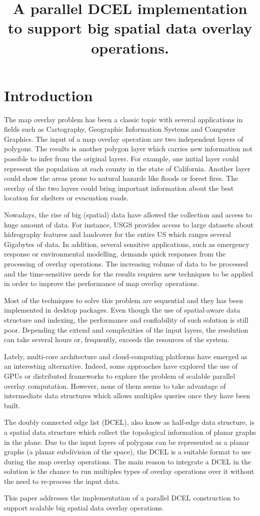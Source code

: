 \documentclass[a4paper,10pt]{article}
\title{A parallel DCEL implementation to support big spatial data overlay
operations.}
\author{}
\begin{document}
\section{Introduction}

The map overlay problem has been a classic topic with several applications in fields such as Cartography, Geographic Information Systems and Computer Graphics.  The input of a map overlay operation are two independent layers of polygons. The results is another polygon layer which carries new information not possible to infer from the original layers. For example, one initial layer could represent the population at each county in the state of California.  Another layer could show the areas prone to natural hazards like floods or forest fires.  The overlay of the two layers could bring important information about the best location for shelters or evacuation roads.

Nowadays, the rise of big (spatial) data have allowed the collection and access to huge amount of data.  For instance, USGS provides access to large datasets about hidrography features and landcover for the entire US which ranges several Gigabytes of data. In addition, several sensitive applications, such as emergency response or environmental modelling, demands quick responses from the processing of overlay operations. The increasing volume of data to be processed and the time-sensitive needs for the results requires new techniques to be applied in order to improve the performance of map overlay operations.

Most of the techniques to solve this problem are sequential and they has been implemented in desktop packages. Even though the use of spatial-aware data structure and indexing, the performance and confiability of such solution is still poor. Depending the extend and complexities of the input layers, the resolution can take several hours or, frequently, exceeds the resources of the system.  

Lately, multi-core architecture and cloud-computing platforms have emerged as an interesting alternative.  Indeed, some approaches have explored the use of GPUs or distributed frameworks to explore the problem of scalable parallel overlay computation.  However, none of them seems to take advantage of intermediate data structures which allows multiples queries once they have been built.

The doubly connected edge list (DCEL), also know as half-edge data structure, is a spatial data structure which collect the topological information of planar graphs in the plane.  Due to the input layers of polygons can be represented as a planar graphs (a planar subdivision of the space), the DCEL is a suitable format to use during the map overlay operations.  The main reason to integrate a DCEL in the solution is the chance to run multiples types of overlay operations over it without the need to re-process the input data.

This paper addresses the implementation of a parallel DCEL construction to support scalable big spatial data overlay operations.
\end{document}
